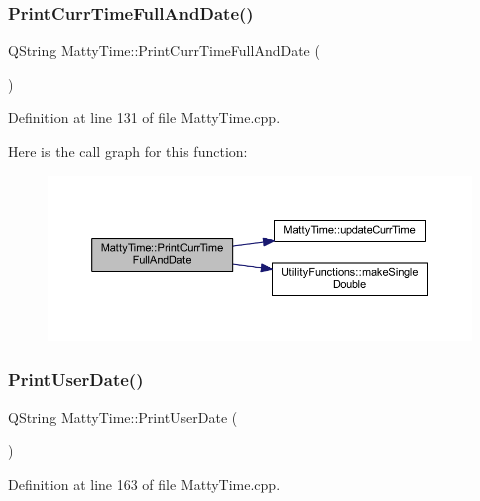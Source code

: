 \subsubsection{\texorpdfstring{Print\+Curr\+Time\+Full\+And\+Date()}{PrintCurrTimeFullAndDate()}}
{\footnotesize\ttfamily Q\+String Matty\+Time\+::\+Print\+Curr\+Time\+Full\+And\+Date (\begin{DoxyParamCaption}{ }\end{DoxyParamCaption})\hspace{0.3cm}{\ttfamily [static]}}



Definition at line 131 of file Matty\+Time.\+cpp.

Here is the call graph for this function\+:
\nopagebreak
\begin{figure}[H]
\begin{center}
\leavevmode
\includegraphics[width=350pt]{classMattyTime_a82a6b06fa496b4d0f9b8d6e11d5b03c8_cgraph}
\end{center}
\end{figure}
\hypertarget{classMattyTime_a646278576993d7ed05af67aee6ac96cb}{}\label{classMattyTime_a646278576993d7ed05af67aee6ac96cb} 
\subsubsection{\texorpdfstring{Print\+User\+Date()}{PrintUserDate()}}
{\footnotesize\ttfamily Q\+String Matty\+Time\+::\+Print\+User\+Date (\begin{DoxyParamCaption}{ }\end{DoxyParamCaption})}



Definition at line 163 of file Matty\+Time.\+cpp.

